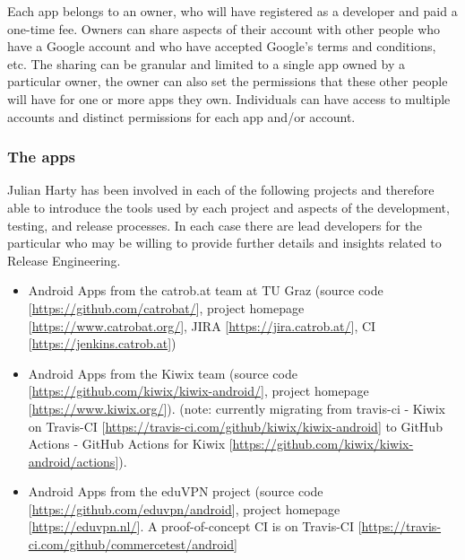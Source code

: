 \documentclass[a4paper]{article}
\begin{document}
Each app belongs to an owner, who will have registered as a developer and paid a one-time fee. Owners can share aspects of their account with other people who have a Google account and who have accepted Google's terms and conditions, etc. The sharing can be granular and limited to a single app owned by a particular owner, the owner can also set the permissions that these other people will have for one or more apps they own. Individuals can have access to multiple accounts and distinct permissions for each app and/or account.


\subsubsection{The apps}
Julian Harty has been involved in each of the following projects and therefore able to introduce the tools used by each project and aspects of the development, testing, and release processes. In each case there are lead developers for the particular who may be willing to provide further details and insights related to Release Engineering.

\begin{itemize}
\item Android Apps from the catrob.at team at TU Graz (source code   [\href{https://github.com/catrobat/}{https://github.com/catrobat/}], project homepage [\href{https://www.catrobat.org/}{https://www.catrobat.org/}], JIRA [\href{https://jira.catrob.at/}{https://jira.catrob.at/}], CI [\href{https://jenkins.catrob.at/}{https://jenkins.catrob.at}])

\item Android Apps from the Kiwix team (source code [\href{https://github.com/kiwix/kiwix-android/}{https://github.com/kiwix/kiwix-android/}], project homepage [\href{https://www.kiwix.org/}{https://www.kiwix.org/}]). (note: currently migrating from travis-ci - Kiwix on Travis-CI [\href{https://travis-ci.com/github/kiwix/kiwix-android}{https://travis-ci.com/github/kiwix/kiwix-android}] to GitHub Actions -  GitHub Actions for Kiwix [\href{https://github.com/kiwix/kiwix-android/actions}{https://github.com/kiwix/kiwix-android/actions}]).

\item Android Apps from the eduVPN project (source code [\href{https://github.com/eduvpn/android}{https://github.com/eduvpn/android}], project homepage [\href{https://eduvpn.nl/}{https://eduvpn.nl/}]. A proof-of-concept CI is on Travis-CI [\href{https://travis-ci.com/github/commercetest/android}{https://travis-ci.com/github/commercetest/android}]
\end{itemize}
\end{document}
